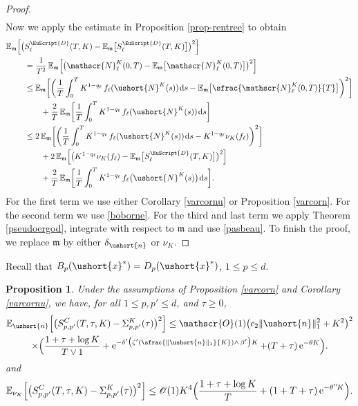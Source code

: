 \documentclass[10pt]{amsart}
\newcommand{\Psfrac}[2]{(\sfrac{#1}{#2})}
\newcommand{\scaleto}[2]{#1}
\let\mathcal\mathscr
\numberwithin{equation}{section}
\theoremstyle{plain}
\newtheorem{proposition}[theorem]{Proposition}
\theoremstyle{definition}
\newcommand{\E}{{\mathbb{E}}}
\newcommand{\Oun}{\mathcal{O}(1)}
\newcommand{\sK}{K}
\newcommand{\vecn}{\ushort{n}}
\newcommand{\vecxf}{\ushort{x}^*}
\newcommand{\leproc}{\ushort{N}^{K}}
\newcommand{\nuk}{\nu_{K}}\let\snuk\nuk
\newcommand{\e}{\operatorname{e}}
\newcommand{\dd}{\hspace{1pt}\mathrm{d}}
\newcommand{\norm}[1]{\|#1\|_{1}}\let\snorm\norm
\begin{document}
\begin{proof}
\begin{multline}
\end{multline}
Now we apply the estimate in Proposition \ref{prop-rentree} to obtain
\begin{align*}
\E_{\mathfrak{m}} \Bigl[\bigl(&S^{{\EuScript{D}}}_{\ell}(T,K) -\E_{\mathfrak{m}}\bigl[S^{\EuScript{D}}_{\ell}(T,K)\bigr]\bigr)^2\Bigr]\\
& =\frac{1}{T^2} \, \E_{\mathfrak{m}} \Bigl[\bigl(\mathcal{N}^{\sK}_\ell(0,T) -
\E_{\mathfrak{m}}\bigl[\mathcal{N}^{\sK}_\ell(0,T)\bigr]\bigr)^2\Bigr]\\
& \leq \E_{\mathfrak{m}} \biggl[\biggl(
\frac{1}{T} \int_0^T K^{1-q_\ell}\, f_\ell(\leproc(s)) \dd s -\E_{\mathfrak{m}}\bigl[\sfrac{\mathcal{N}^{\sK}_\ell(0,T)}{T}\bigr]
\biggr)^2\biggr]\\
& \qquad + \frac{2}{T} \, \E_{\mathfrak{m}}\biggl[
\frac{1}{T} \int_0^T K^{1-q_\ell} \, f_\ell(\leproc(s)) \dd s
\biggr] \\
& \leq 2\,\E_{\mathfrak{m}}\biggl[\biggl(
\frac{1}{T} \int_0^T K^{1-q_\ell}\, f_\ell(\leproc(s)) \dd s - K^{1-q_\ell} \nuk(f_\ell)
\biggr)^2\biggr] \\
& \qquad + 2\,\E_{\mathfrak{m}}\Bigl[\bigl(K^{1-q_\ell} \nuk(f_\ell)-\E_{\mathfrak{m}}\bigl[S^{\EuScript{D}}_{\ell}(T,K)\bigr]
\bigr)^2\Bigr]\\
& \qquad + \frac{2}{T} \, \E_{\mathfrak{m}}\biggl[\frac{1}{T} \int_0^T K^{1-q_\ell} \, f_\ell\bigl(\leproc(s)\bigr) \dd s
\biggr].
\end{align*}
For the first term we use either Corollary \ref{varcornu} or Proposition \ref{varcorn}. For the second term we use
\eqref{boborne}. For the third and last term we apply Theorem \ref{pseudoergod}, integrate with respect to $\mathfrak{m}$ and use
\eqref{pasbeau}. To finish the proof, we replace $\mathfrak{m}$ by either $\delta_{\vecn}$ or $\nuk$.
\end{proof}

Recall that $B_{p}(\vecxf)=D_{p}(\vecxf)$, $1\leq p\leq d$.
\begin{proposition}
\label{vs4}
Under the assumptions of Proposition \ref{varcorn} and Corollary \ref{varcornu}, we have, for all $1\leq p,p'\leq d$, and $\tau\geq 0$,
\begin{multline*}
\E_{\vecn}\Bigl[\bigl(S^{C}_{p,p'}(T,\tau,K)-\Sigma^{\sK}_{p,p'}(\tau)\bigr)^2\Bigr]
\leq \Oun \bigl(c_2\norm{\vecn}^{2} +K^2\bigr)^2\\
\times \Bigl(\frac{1+\tau+\log K}{T\vee 1}+ \e^{-\delta'\bigl(\zeta' \Psfrac{\|\vecn\|_{1}}{K}\wedge\, \beta'\bigr)K}
+(T+\tau) \e^{-\theta K}
\Bigr).
\end{multline*}
and
\[
\E_{\snuk}\Bigl[\bigl(S^{C}_{p,p'}(T,\tau,K)-\Sigma^{\sK}_{p,p'}(\tau)\bigr)^2\Bigr]
\leq \Oun K^{\scaleto{4}{4pt}} \Bigl(\frac{1+\tau+\log K}{T}+ (1+T+\tau)\e^{-\theta''\! K} \Bigr).
\]
\end{proposition}
\end{document}
